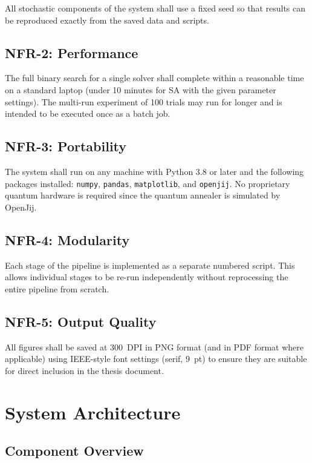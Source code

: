 \documentclass[12pt,a4paper]{article}
\begin{document}
All stochastic components of the system shall use a fixed seed so that results
can be reproduced exactly from the saved data and scripts.

\subsection{NFR-2: Performance}

The full binary search for a single solver shall complete within a reasonable
time on a standard laptop (under 10 minutes for SA with the given parameter
settings). The multi-run experiment of 100 trials may run for longer and is
intended to be executed once as a batch job.

\subsection{NFR-3: Portability}

The system shall run on any machine with Python 3.8 or later and the
following packages installed: \texttt{numpy}, \texttt{pandas},
\texttt{matplotlib}, and \texttt{openjij}. No proprietary quantum hardware
is required since the quantum annealer is simulated by OpenJij.

\subsection{NFR-4: Modularity}

Each stage of the pipeline is implemented as a separate numbered script.
This allows individual stages to be re-run independently without reprocessing
the entire pipeline from scratch.

\subsection{NFR-5: Output Quality}

All figures shall be saved at 300~DPI in PNG format (and in PDF format where
applicable) using IEEE-style font settings (serif, 9~pt) to ensure they are
suitable for direct inclusion in the thesis document.

\section{System Architecture}

\subsection{Component Overview}
\end{document}
